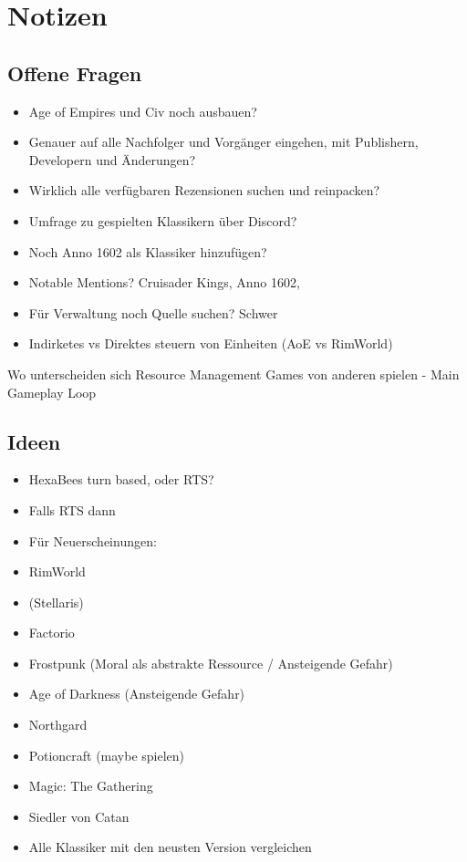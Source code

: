 \section*{Notizen}
\subsection*{Offene Fragen}
\begin{itemize}
    \item Age of Empires und Civ noch ausbauen?
    \item Genauer auf alle Nachfolger und Vorgänger eingehen, mit Publishern, Developern und Änderungen?
    \item Wirklich alle verfügbaren Rezensionen suchen und reinpacken?
    \item Umfrage zu gespielten Klassikern über Discord?
    \item Noch Anno 1602 als Klassiker hinzufügen?
    \item Notable Mentions? Cruisader Kings, Anno 1602, 
    \item Für Verwaltung noch Quelle suchen? Schwer
    \item Indirketes vs Direktes steuern von Einheiten (AoE vs RimWorld)
\end{itemize}

Wo unterscheiden sich Resource Management Games von anderen spielen
- Main Gameplay Loop 

\subsection*{Ideen}
\begin{itemize}
    \item HexaBees turn based, oder RTS?
    \item Falls RTS dann 
    \item Für Neuerscheinungen:
    \item RimWorld
    \item (Stellaris)
    \item Factorio
    \item Frostpunk (Moral als abstrakte Ressource / Ansteigende Gefahr)
    \item Age of Darkness (Ansteigende Gefahr)
    \item Northgard
    \item Potioncraft (maybe spielen)
    \item Magic: The Gathering
    \item Siedler von Catan
    \item Alle Klassiker mit den neusten Version vergleichen
\end{itemize}

